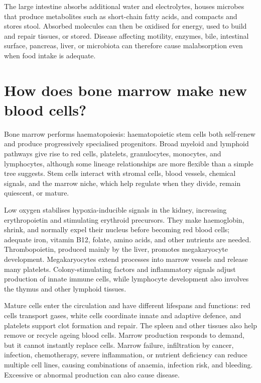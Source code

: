 \documentclass[11pt,oneside]{report}
\begin{document}
The large intestine absorbs additional water and electrolytes, houses microbes
that produce metabolites such as short-chain fatty acids, and compacts and
stores stool. Absorbed molecules can then be oxidised for energy, used to build
and repair tissues, or stored. Disease affecting motility, enzymes, bile,
intestinal surface, pancreas, liver, or microbiota can therefore cause
malabsorption even when food intake is adequate.

\section{How does bone marrow make new blood cells?}

Bone marrow performs haematopoiesis: haematopoietic stem cells both self-renew
and produce progressively specialised progenitors. Broad myeloid and lymphoid
pathways give rise to red cells, platelets, granulocytes, monocytes, and
lymphocytes, although some lineage relationships are more flexible than a
simple tree suggests. Stem cells interact with stromal cells, blood vessels,
chemical signals, and the marrow niche, which help regulate when they divide,
remain quiescent, or mature.

Low oxygen stabilises hypoxia-inducible signals in the kidney, increasing
erythropoietin and stimulating erythroid precursors. They make haemoglobin,
shrink, and normally expel their nucleus before becoming red blood cells;
adequate iron, vitamin B12, folate, amino acids, and other nutrients are
needed. Thrombopoietin, produced mainly by the liver, promotes megakaryocyte
development. Megakaryocytes extend processes into marrow vessels and release
many platelets. Colony-stimulating factors and inflammatory signals adjust
production of innate immune cells, while lymphocyte development also involves
the thymus and other lymphoid tissues.

Mature cells enter the circulation and have different lifespans and functions:
red cells transport gases, white cells coordinate innate and adaptive defence,
and platelets support clot formation and repair. The spleen and other tissues
also help remove or recycle ageing blood cells. Marrow production responds to
demand, but it cannot instantly replace cells. Marrow failure, infiltration by
cancer, infection, chemotherapy, severe inflammation, or nutrient deficiency
can reduce multiple cell lines, causing combinations of anaemia, infection
risk, and bleeding. Excessive or abnormal production can also cause disease.
\end{document}
